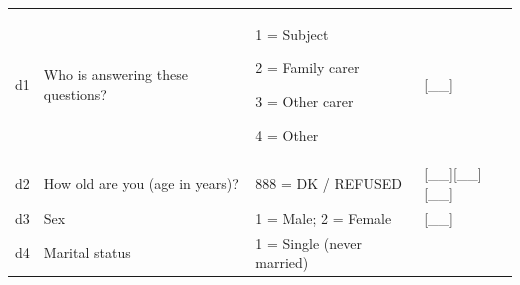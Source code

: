 \documentclass[12pt,a4paper]{book}
\theoremstyle{definition}
\theoremstyle{definition}
\theoremstyle{definition}
\theoremstyle{remark}
\begin{document}
\begin{longtable}[]{@{}llll@{}}
\toprule
\begin{minipage}[t]{0.24\columnwidth}\raggedright
d1\strut
\end{minipage} & \begin{minipage}[t]{0.24\columnwidth}\raggedright
Who is answering these questions?\strut
\end{minipage} & \begin{minipage}[t]{0.24\columnwidth}\raggedright
1 = Subject

2 = Family carer

3 = Other carer

4 = Other\strut
\end{minipage} & \begin{minipage}[t]{0.24\columnwidth}\raggedright
{[}\_\_{]}\strut
\end{minipage}\tabularnewline
\begin{minipage}[t]{0.10\columnwidth}\raggedright
d2\strut
\end{minipage} & \begin{minipage}[t]{0.34\columnwidth}\raggedright
How old are you (age in years)?\strut
\end{minipage} & \begin{minipage}[t]{0.29\columnwidth}\raggedright
888 = DK / REFUSED\strut
\end{minipage} & \begin{minipage}[t]{0.15\columnwidth}\raggedright
{[}\_\_{]}{[}\_\_{]}{[}\_\_{]}\strut
\end{minipage}\tabularnewline
\begin{minipage}[t]{0.10\columnwidth}\raggedright
d3\strut
\end{minipage} & \begin{minipage}[t]{0.34\columnwidth}\raggedright
Sex\strut
\end{minipage} & \begin{minipage}[t]{0.29\columnwidth}\raggedright
1 = Male; 2 = Female\strut
\end{minipage} & \begin{minipage}[t]{0.15\columnwidth}\raggedright
{[}\_\_{]}\strut
\end{minipage}\tabularnewline
\begin{minipage}[t]{0.24\columnwidth}\raggedright
d4\strut
\end{minipage} & \begin{minipage}[t]{0.24\columnwidth}\raggedright
Marital status\strut
\end{minipage} & \begin{minipage}[t]{0.24\columnwidth}\raggedright
1 = Single (never married)


\end{minipage}
\end{longtable}
\end{document}
